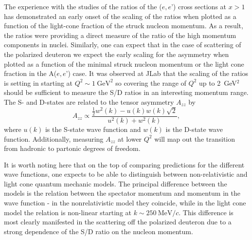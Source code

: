 The experience with the studies of the ratios of the ($e,e’$) cross sections at $x>1$ has demonstrated an early onset of the scaling of the ratios when plotted as a function of the light-cone fraction of the struck nucleon momentum.  As a result, the ratios were providing a direct measure of the ratio of the high momentum components in nuclei.  Similarly, one can expect that in the case of scattering of the polarized deuteron we expect the early scaling for the asymmetry when plotted as a function of the minimal struck nucleon momentum or the light cone fraction in the A($e,e’$) case.
It was observed at JLab that the scaling of the ratios is setting in starting at $Q^2 \sim 1 \mathrm{~GeV}^2$ so covering the range of $Q^2$ up to 2~GeV$^2$ should be sufficient to  measure the S/D ratios in an interesting momentum range. The S- and D-states are related to the tensor asymmetry $A_{zz}$ by~\cite{Frankfurt:1988nt}
\begin{equation}
	A_{zz} \propto \frac{\frac{1}{2}w^2(k)-u(k)w(k)\sqrt{2}}{u^2(k)+w^2(k)},
\end{equation}
where $u(k)$ is the S-state wave function and $w(k)$ is the D-state wave function. Additionally, measuring $A_{zz}$ at lower $Q^2$ will map out the transition from hadronic to partonic degrees of freedom.





It is worth noting here that on the top of comparing predictions for the different wave functions, one expects to be able to distinguish between non-relativistic and light cone quantum mechanic models.  The principal difference between the models is the relation between the spectator momentum and momentum in the wave function - in the nonrelativistic model they coincide, while in the light cone model the relation is non-linear starting at $k \sim 250 \mathrm{~MeV}/c$. This difference is most clearly manifested in the scattering off the polarized deuteron due to a strong dependence of the S/D ratio on the nucleon momentum.